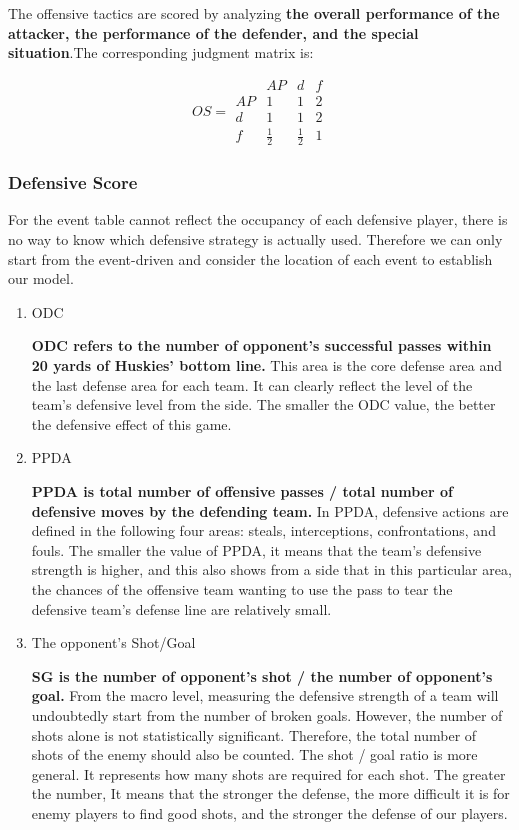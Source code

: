 \documentclass{mcmthesis}
\begin{document}
	The offensive tactics are scored by analyzing \textbf{the overall performance of the attacker, the performance of the defender, and the special situation}.The corresponding judgment matrix is:

	\begin{equation}\label{mat:2}
		OS=
	  \begin{matrix}
		& AP & d &f\\
   		AP & 1 & 1 & 2 \\
   		d & 1 & 1 & 2 \\
   		f & \frac{1}{2} & \frac{1}{2} & 1
  	\end{matrix}
	\end{equation}
	
\subsubsection{Defensive Score}
	\qquad For the event table cannot reflect the occupancy of each defensive player, there is no way to know which defensive strategy is actually used. Therefore we can only start from the event-driven and consider the location of each event to establish our model.
	\begin{enumerate}
	\item ODC
	
	\qquad \textbf{ODC refers to the number of opponent's successful passes within 20 yards of Huskies' bottom line.} This area is the core defense area and the last defense area for each team. It can clearly reflect the level of the team's defensive level from the side. The smaller the ODC value, the better the defensive effect of this game.

	\item PPDA
	
	\qquad \textbf{PPDA is total number of offensive passes / total number of defensive moves by the defending team.} In PPDA, defensive actions are defined in the following four areas: steals, interceptions, confrontations, and fouls. The smaller the value of PPDA, it means that the team's defensive strength is higher, and this also shows from a side that in this particular area, the chances of the offensive team wanting to use the pass to tear the defensive team's defense line are relatively small.

	\item The opponent's Shot/Goal
	
	\qquad \textbf{SG is the number of opponent's shot / the number of opponent's goal.} From the macro level, measuring the defensive strength of a team will undoubtedly start from the number of broken goals.  However, the number of shots alone is not statistically significant. Therefore, the total number of shots of the enemy should also be counted. The shot / goal ratio is more general. It represents how many shots are required for each shot. The greater the number,  It means that the stronger the defense, the more difficult it is for enemy players to find good shots, and the stronger the defense of our players.

	\end{enumerate}
	
\end{document}

